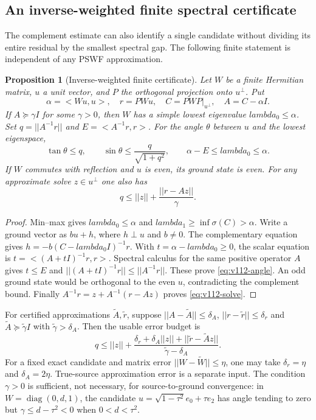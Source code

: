 \documentclass[11pt]{article}
\def\lambda{lambda}%
\def\norm#1{||#1||}%
\def\ip#1#2{<#1,#2>}%
\newtheorem{proposition}[theorem]{Proposition}
\theoremstyle{remark}
\newcommand{\norm}[1]{\left\lVert #1\right\rVert}
\newcommand{\ip}[2]{\left\langle #1,#2\right\rangle}
\begin{document}
\subsection{An inverse-weighted finite spectral certificate}
The complement estimate can also identify a single candidate without
dividing its entire residual by the smallest spectral gap.
The following finite statement is independent of any PSWF approximation.

\begin{proposition}[Inverse-weighted finite certificate]
\label{prop:v112-schur-angle}
Let $W$ be a finite Hermitian matrix, $u$ a unit vector, and $P$ the
orthogonal projection onto $u^\perp$. Put
\[
 \alpha=\ip{Wu}{u},\quad r=PWu,\quad
 C=PWP|_{u^\perp},\quad A=C-\alpha I.
\]
If $A\succeq\gamma I$ for some $\gamma>0$, then $W$ has a simple
lowest eigenvalue $\lambda_0\le\alpha$. Set
$q=\norm{A^{-1}r}$ and $E=\ip{A^{-1}r}{r}$. For the angle $\theta$
between $u$ and the lowest eigenspace,
\begin{equation}\label{eq:v112-angle}
 \tan\theta\le q,\qquad
 \sin\theta\le\frac{q}{\sqrt{1+q^2}},\qquad
 \alpha-E\le\lambda_0\le\alpha.
\end{equation}
If $W$ commutes with reflection and $u$ is even, its ground state is even.
For any approximate solve $z\in u^\perp$ one also has
\begin{equation}\label{eq:v112-solve}
 q\le\norm z+\frac{\norm{r-Az}}{\gamma}.
\end{equation}
\end{proposition}
\begin{proof}
Min--max gives $\lambda_0\le\alpha$ and
$\lambda_1\ge\inf\sigma(C)>\alpha$. Write a ground vector as $bu+h$,
where $h\perp u$ and $b\ne0$. The complementary equation gives
$h=-b(C-\lambda_0 I)^{-1}r$. With $t=\alpha-\lambda_0\ge0$, the
scalar equation is $t=\ip{(A+tI)^{-1}r}{r}$. Spectral calculus for
the same positive operator $A$ gives $t\le E$ and
$\norm{(A+tI)^{-1}r}\le\norm{A^{-1}r}$. These prove
\eqref{eq:v112-angle}. An odd ground state would be orthogonal to the
even $u$, contradicting the complement bound. Finally
$A^{-1}r=z+A^{-1}(r-Az)$ proves \eqref{eq:v112-solve}.
\end{proof}

For certified approximations $\widetilde A,\widetilde r$, suppose
$\norm{A-\widetilde A}\le\delta_A$,
$\norm{r-\widetilde r}\le\delta_r$ and
$\widetilde A\succeq\widetilde\gamma I$ with
$\widetilde\gamma>\delta_A$. Then the usable error budget is
\[
 q\le\norm z+
 \frac{\delta_r+\delta_A\norm z+
       \norm{\widetilde r-\widetilde A z}}
      {\widetilde\gamma-\delta_A}.
\]
For a fixed exact candidate and matrix error $\norm{W-\widetilde W}\le\eta$,
one may take $\delta_r=\eta$ and $\delta_A=2\eta$.
True-source approximation error is a separate input. The condition
$\gamma>0$ is sufficient, not necessary, for source-to-ground
convergence: in $W=\operatorname{diag}(0,d,1)$, the candidate
$u=\sqrt{1-\tau^2}e_0+\tau e_2$ has angle tending to zero but
$\gamma\le d-\tau^2<0$ when $0<d<\tau^2$.
\end{document}

